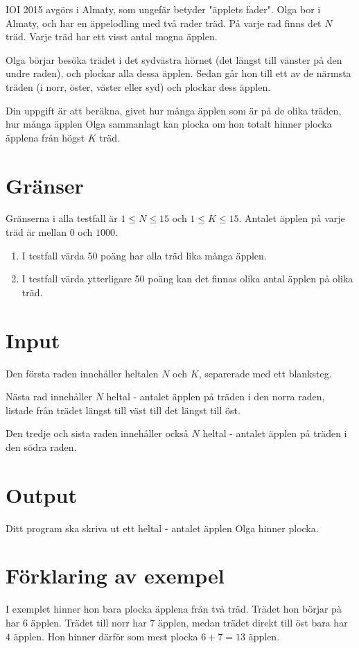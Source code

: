 
IOI 2015 avgörs i Almaty, som ungefär betyder "äpplets fader". Olga bor i Almaty, och har en äppelodling med två rader träd.
På varje rad finns det $N$ träd. Varje träd har ett visst antal mogna äpplen.

Olga börjar besöka trädet i det sydvästra hörnet (det längst till vänster på den undre raden), och plockar alla dessa äpplen.
Sedan går hon till ett av de närmsta träden (i norr, öster, väster eller syd) och plockar dess äpplen.

Din uppgift är att beräkna, givet hur många äpplen som är på de olika träden, hur många äpplen Olga sammanlagt kan plocka
om hon totalt hinner plocka äpplena från högst $K$ träd.

\section*{Gränser}
Gränserna i alla testfall är $1 \le N \le 15$ och $1 \le K \le 15$. Antalet äpplen på varje
träd är mellan $0$ och $1000$.

\begin{enumerate}
\item I testfall värda 50 poäng har alla träd lika många äpplen.
\item I testfall värda ytterligare 50 poäng kan det finnas olika antal äpplen på olika träd.
\end{enumerate}

\section*{Input}
Den första raden innehåller heltalen $N$ och $K$, separerade med ett blanksteg.

Nästa rad innehåller $N$ heltal - antalet äpplen på träden i den norra raden, listade från trädet längst till väst till det längst till öst.

Den tredje och sista raden innehåller också $N$ heltal - antalet äpplen på träden i den södra raden.

\section*{Output}
Ditt program ska skriva ut ett heltal - antalet äpplen Olga hinner plocka.

\section*{Förklaring av exempel}
I exemplet hinner hon bara plocka äpplena från två träd. Trädet hon börjar på har $6$ äpplen. Trädet till norr har $7$ äpplen, medan 
trädet direkt till öst bara har $4$ äpplen. Hon hinner därför som mest plocka $6 + 7 = 13$ äpplen.
